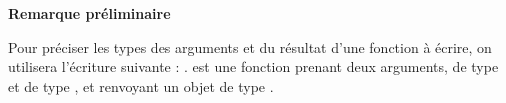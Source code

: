 
\textbf{Remarque préliminaire}

Pour préciser les types des arguments et du résultat d'une fonction à écrire, on utilisera l'écriture suivante : 
.  est une fonction prenant deux arguments,  de type  et  de type , et renvoyant un objet de type .












